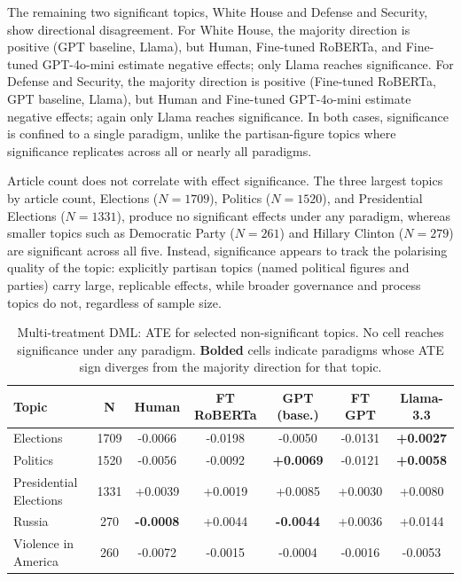 The remaining two significant topics, White House and Defense and Security, show directional disagreement. For White House, the majority direction is positive (GPT baseline, Llama), but Human, Fine-tuned RoBERTa, and Fine-tuned GPT-4o-mini estimate negative effects; only Llama reaches significance. For Defense and Security, the majority direction is positive (Fine-tuned RoBERTa, GPT baseline, Llama), but Human and Fine-tuned GPT-4o-mini estimate negative effects; again only Llama reaches significance. In both cases, significance is confined to a single paradigm, unlike the partisan-figure topics where significance replicates across all or nearly all paradigms.

Article count does not correlate with effect significance. The three largest topics by article count, Elections ($N = \num{1709}$), Politics ($N = \num{1520}$), and Presidential Elections ($N = \num{1331}$), produce no significant effects under any paradigm, whereas smaller topics such as Democratic Party ($N = 261$) and Hillary Clinton ($N = 279$) are significant across all five. Instead, significance appears to track the polarising quality of the topic: explicitly partisan topics (named political figures and parties) carry large, replicable effects, while broader governance and process topics do not, regardless of sample size.

\begin{table}[ht]
  \centering
  \setlength{\tabcolsep}{4pt}
  \small
  \begin{tabular}{l c
      S[table-format=+1.4]
      S[table-format=+1.4]
      S[table-format=+1.4]
      S[table-format=+1.4]
      S[table-format=+1.4]}
    \toprule
    \textbf{Topic} & {\textbf{N}}
      & {\textbf{Human}}
      & {\textbf{FT RoBERTa}}
      & {\textbf{GPT (base.)}}
      & {\textbf{FT GPT}}
      & {\textbf{Llama-3.3}} \\
    \midrule
    Elections & 1709 & -0.0066 & -0.0198 & -0.0050 & -0.0131 & \textbf{+0.0027} \\
    Politics & 1520 & -0.0056 & -0.0092 & \textbf{+0.0069} & -0.0121 & \textbf{+0.0058} \\
    Presidential Elections & 1331 & +0.0039 & +0.0019 & +0.0085 & +0.0030 & +0.0080 \\
    Russia & 270 & \textbf{-0.0008} & +0.0044 & \textbf{-0.0044} & +0.0036 & +0.0144 \\
    Violence in America & 260 & -0.0072 & -0.0015 & -0.0004 & -0.0016 & -0.0053 \\
    \bottomrule
  \end{tabular}
  \caption{Multi-treatment DML: ATE for selected non-significant topics. No cell reaches significance under any paradigm. \textbf{Bolded} cells indicate paradigms whose ATE sign diverges from the majority direction for that topic.}
  \label{tab:multi-nonsig}
\end{table}

